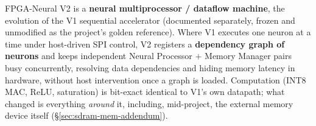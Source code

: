 \thispagestyle{plain}
\noindent
{}

\vspace{6pt}
\noindent
{\small FPGA-Neural V2 is a \textbf{neural multiprocessor / dataflow machine},
the evolution of the V1 sequential accelerator (documented separately, frozen
and unmodified as the project's golden reference). Where V1 executes one
neuron at a time under host-driven SPI control, V2 registers a
\textbf{dependency graph of neurons} and keeps  independent
Neural Processor $+$ Memory Manager pairs busy concurrently, resolving data
dependencies and hiding memory latency in hardware, without host
intervention once a graph is loaded. Computation (INT8 MAC, ReLU,
saturation) is bit-exact identical to V1's own datapath; what changed is
everything \emph{around} it, including, mid-project, the external memory
device itself (\S\ref{sec:sdram-mem-addendum}).}

